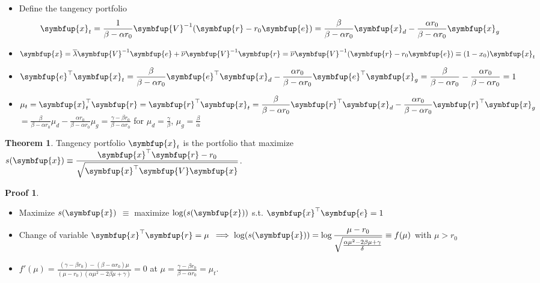 \documentclass[10pt]{beamer}
\newcommand{\ds}{\displaystyle}
\newcommand{\ie}{\;\Longrightarrow\;}
\newcommand{\vx}{\symbfup{x}}
\newcommand{\vV}{\symbfup{V}}
\newcommand{\ve}{\symbfup{e}}
\newcommand{\vr}{\symbfup{r}}
\theoremstyle{definition}
\newtheorem*{thm}{Theorem}
\newtheorem*{prf}{Proof}
\begin{document}
\begin{frame}
  \begin{itemize}[<+->]
    \item Define the tangency portfolio
      \onslide<+->
      \begin{align*}
        \ds\vx_t = \frac{1}{\beta-\alpha r_0}\vV^{-1}(\vr - r_0\ve) = \frac{\beta}{\beta - \alpha r_0}\vx_d - \frac{\alpha r_0}{\beta - \alpha r_0}\vx_g
      \end{align*}
    \item $\ds\vx = \overline{\lambda}\vV^{-1}\ve + \overline{\nu}\vV^{-1}\vr = \overline{\nu}\vV^{-1}(\vr - r_0\ve)\equiv(1 - x_0)\vx_t$
    \item $\ds\ve^\top\vx_t = \frac{\beta}{\beta - \alpha r_0}\ve^\top\vx_d - \frac{\alpha r_0}{\beta - \alpha r_0}\ve^\top\vx_g = \frac{\beta}{\beta - \alpha r_0} - \frac{\alpha r_0}{\beta - \alpha r_0} = 1$
    \item $\ds\mu_t = \vx^\top_t\vr = \vr^\top\vx_t = \frac{\beta}{\beta - \alpha r_0}\vr^\top\vx_d - \frac{\alpha r_0}{\beta - \alpha r_0}\vr^\top\vx_g$ \\$\ds = \frac{\beta}{\beta - \alpha r_0}\mu_d - \frac{\alpha r_0}{\beta - \alpha r_0}\mu_g = \frac{\gamma - \beta r_0}{\beta - \alpha r_0}$ for $\ds\mu_d = \frac{\gamma}{\beta}$, $\ds\mu_g = \frac{\beta}{\alpha}$
  \end{itemize}
\end{frame}

\begin{frame}
  \onslide<+->
  \begin{thm}
    Tangency portfolio $\vx_t$ is the portfolio that maximize $\ds s(\vx)\equiv\frac{\vx^\top\vr - r_0}{\sqrt{\vx^\top\vV\vx}}$.
  \end{thm}
  \begin{prf}
    \begin{itemize}[<+->]
      \item Maximize $s(\vx)$ $\equiv$ maximize $\log(s(\vx))$ s.t. $\ds\vx^\top\ve = 1$ 
      \item Change of variable $\vx^\top\vr = \mu$ $\ds\ie\log(s(\vx)) = \log\frac{\mu - r_0}{\sqrt{\frac{\alpha\mu^2 - 2\beta\mu + \gamma}{\delta}}}\equiv f(\mu)$ with $\mu > r_0$
      \item $\ds f'(\mu) = \frac{(\gamma - \beta r_0) - (\beta - \alpha r_0)\mu}{(\mu - r_0)\left(\alpha\mu^2 - 2\beta\mu + \gamma\right)} = 0$ at $\ds\mu = \frac{\gamma - \beta r_0}{\beta - \alpha r_0} = \mu_t$.
    \end{itemize}
  \end{prf}
\end{frame}
\end{document}
